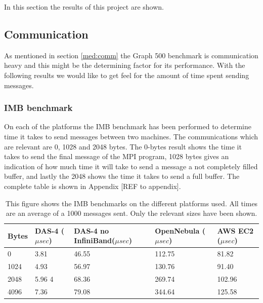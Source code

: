 In this section the results of this project are shown.

\subsection{Communication}
As mentioned in section \ref{med:comm} the Graph 500 benchmark is communication heavy and this might be the determining factor for its performance. With the following results we would like to get feel for the amount of time spent sending messages.

\subsubsection{IMB benchmark}
On each of the platforms the IMB benchmark has been performed to determine time it takes to send messages between two machines. The communications which are relevant are 0, 1028 and 2048 bytes. The 0-bytes result shows the time it takes to send the final message of the MPI program, 1028 bytes gives an indication of how much time it will take to send a message a not completely filled buffer, and lastly the 2048 shows the time it takes to send a full buffer. The complete table is shown in Appendix [REF to appendix].
\begin{table}[!h]
\begin{tabular}{|l|l|l|l|l|}
\hline
Bytes & DAS-4 ($\mu sec$) & DAS-4 no InfiniBand($\mu sec$) & OpenNebula ($\mu sec$) & AWS EC2 ($\mu sec$)\\ \hline
0 & 3.81 &  46.55  & 112.75 &   81.82 \\ \hline
1024 & 4.93 & 56.97  &  130.76 &  91.40  \\ \hline 
2048 & 5.96 4 & 68.36 & 269.74 &  102.96 \\ \hline
4096 & 7.36 & 79.08  & 344.64 &  125.58  \\ \hline 
\end{tabular}
\caption{This figure shows the IMB benchmarks on the different platforms used. All times are an average of a 1000 messages sent. Only the relevant sizes have been shown.}
\label{tab:imb_bench}
\end{table}


